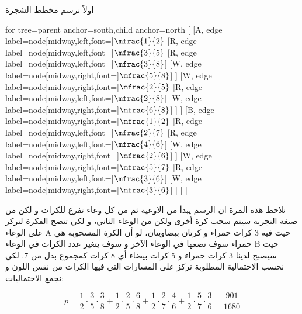 \begin{solution}
	اولاً نرسم مخطط الشجرة 
\begin{center}
	\begin{forest}
		for tree={parent anchor=south,child anchor=north}
		[
		 [A, edge label={node[midway,left,font=\small]{\(\mfrac{1}{2}\)}}
		  [R, edge label={node[midway,left,font=\small]{\(\mfrac{3}{5}\)}} 
		   [R, edge label={node[midway,left,font=\small]{\(\mfrac{3}{8}\)}}]
		   [W, edge label={node[midway,right,font=\small]{\(\mfrac{5}{8}\)}}]
		  ]
		  [W, edge label={node[midway,right,font=\small]{\(\mfrac{2}{5}\)}}
		   [R, edge label={node[midway,left,font=\small]{\(\mfrac{2}{8}\)}}]
		   [W, edge label={node[midway,right,font=\small]{\(\mfrac{6}{8}\)}}]
		  ]
		 ]
         [B, edge label={node[midway,right,font=\small]{\(\mfrac{1}{2}\)}}
          [R, edge label={node[midway,left,font=\small]{\(\mfrac{2}{7}\)}}
           [R, edge label={node[midway,left,font=\small]{\(\mfrac{4}{6}\)}}]
           [W, edge label={node[midway,right,font=\small]{\(\mfrac{2}{6}\)}}]
          ]
          [W, edge label={node[midway,right,font=\small]{\(\mfrac{5}{7}\)}}
           [R, edge label={node[midway,left,font=\small]{\(\mfrac{3}{6}\)}}]
           [W, edge label={node[midway,right,font=\small]{\(\mfrac{3}{6}\)}}]
          ]
         ]
		]
	\end{forest}	
\end{center}
نلاحظ هذه المرة ان الرسم يبدأ من الاوعية ثم من كل وعاء تفرع للكرات و لكن من صيغة التجربة سيتم سحب كرة أخرى ولكن من الوعاء الثاني، و لكي تتضح الفكرة لنركز على الوعاء A حيث فيه 3 كرات حمراء و كرتان بيضاويتان، لو أن الكرة المسحوبة هي حمراء سوف نضعها في الوعاء الآخر و سوف يتغير عدد الكرات في الوعاء B حيث سيصبح لدينا 3 كرات حمراء و 5 كرات بيضاء أي 8 كرات كمجموع بدل من 7. لكي نحسب الاحتمالية المطلوبة نركز على المسارات التي فيها الكرات من نفس اللون و نجمع الاحتماليات:

\[
p = \frac{1}{2}\cdot\frac{3}{5}\cdot\frac{3}{8} + \frac{1}{2}\cdot\frac{2}{5}\cdot\frac{6}{8} + \frac{1}{2}\cdot\frac{2}{7}\cdot\frac{4}{6} + \frac{1}{2}\cdot\frac{5}{7}\cdot\frac{3}{6} = \frac{901}{1680}
\]  
\end{solution}
